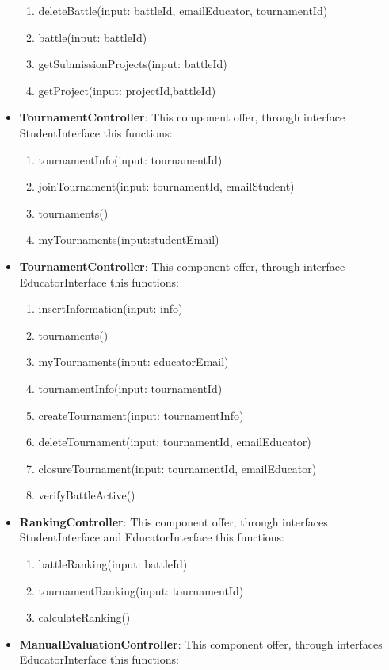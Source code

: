 \begin{itemize}
\begin{enumerate}
        \item deleteBattle(input: battleId, emailEducator, tournamentId)
        \item battle(input: battleId)
        \item getSubmissionProjects(input: battleId)
        \item getProject(input: projectId,battleId)
    \end{enumerate}
  \item \textbf{TournamentController}: This component offer, through interface StudentInterface this functions:
  \begin{enumerate}
       \item tournamentInfo(input: tournamentId)
      \item  joinTournament(input: tournamentId, emailStudent)
      \item tournaments()
      \item myTournaments(input:studentEmail)
  \end{enumerate}
\item \textbf{TournamentController}: This component offer, through interface EducatorInterface this functions:
\begin{enumerate}
        \item insertInformation(input: info)
    \item tournaments()
    \item myTournaments(input: educatorEmail)
   \item tournamentInfo(input: tournamentId)
    \item createTournament(input: tournamentInfo)
    \item deleteTournament(input: tournamentId, emailEducator)
    \item closureTournament(input: tournamentId, emailEducator) 
      \item verifyBattleActive()
\end{enumerate}
\item \textbf{RankingController}: This component offer, through interfaces StudentInterface and EducatorInterface this functions:
\begin{enumerate}
    \item battleRanking(input: battleId)
    \item tournamentRanking(input: tournamentId)
    \item calculateRanking()
\end{enumerate}
\item \textbf{ManualEvaluationController}: This component offer, through interfaces EducatorInterface this functions:

\end{itemize}

